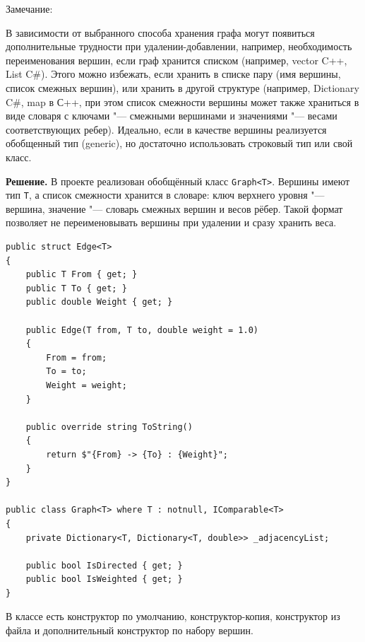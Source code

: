 \documentclass[pract]{SCWorks}
\newcommand{\smalltt}[1]{{\footnotesize\texttt{#1}}}
\begin{document}
    Замечание:

    В зависимости от выбранного способа хранения графа могут появиться дополнительные трудности при удалении-добавлении, например, необходимость переименования вершин, если граф хранится списком (например, vector C++, List C\#). Этого можно избежать, если хранить в списке пару (имя вершины, список смежных вершин), или хранить в другой структуре (например, Dictionary C\#, map в С++, при этом список смежности вершины может также храниться в виде словаря с ключами "--- смежными вершинами и значениями "--- весами соответствующих ребер). Идеально, если в качестве вершины реализуется обобщенный тип (generic), но достаточно использовать строковый тип или свой класс.

    \textbf{Решение.}
    В проекте реализован обобщённый класс \smalltt{Graph<T>}.
    Вершины имеют тип \smalltt{T}, а список смежности хранится в словаре: ключ верхнего уровня "--- вершина, значение "--- словарь смежных вершин и весов рёбер.
    Такой формат позволяет не переименовывать вершины при удалении и сразу хранить веса.

    \begin{verbatim}
public struct Edge<T>
{
    public T From { get; }
    public T To { get; }
    public double Weight { get; }

    public Edge(T from, T to, double weight = 1.0)
    {
        From = from;
        To = to;
        Weight = weight;
    }

    public override string ToString()
    {
        return $"{From} -> {To} : {Weight}";
    }
}

public class Graph<T> where T : notnull, IComparable<T>
{
    private Dictionary<T, Dictionary<T, double>> _adjacencyList;

    public bool IsDirected { get; }
    public bool IsWeighted { get; }
}
    \end{verbatim}

    В классе есть конструктор по умолчанию, конструктор-копия, конструктор из файла и дополнительный конструктор по набору вершин.
\end{document}
